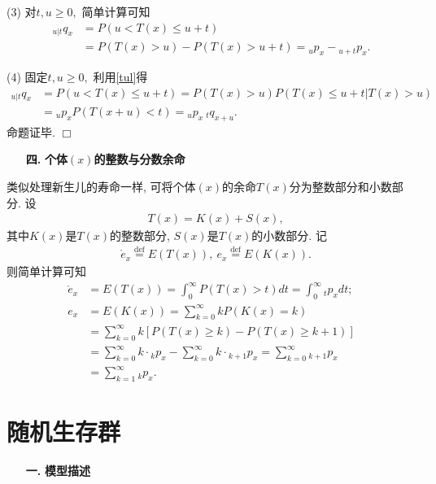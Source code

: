 \documentclass[a4paper,openany, 10pt]{ctexbook}
\newcommand{\hei}{\CJKfamily{hei}}      %
\def\qed{\hfill$\Box$\medskip}
\begin{document}
(3) 对$t,u\ge0,$ 简单计算可知
\begin{align*}
    {}_{u|t}q_x & =P(u<T(x)\leq u+t)                          \\
                & =P(T(x)>u)-P(T(x)>u+t)={}_up_x-{}_{u+t}p_x.
\end{align*}

(4) 固定$t,u\ge0,$ 利用\eqref{tul}得
\begin{align*}
    {}_{u|t}q_x & =P(u<T(x)\leq u+t)=P(T(x)>u)P(T(x)\leq u+t|T(x)>u) \\
                & ={}_up_xP(T(x+u)<t)= {}_up_x{}~_{t}q_{x+u}.
\end{align*}
命题证毕. \qed

\begin{itemize}
    \item[{\bf\hei 四.}]{\bf\hei 个体$(x)$的整数与分数余命}
\end{itemize}
类似处理新生儿的寿命一样, 可将个体$(x)$的余命$T(x)$分为整数部分和小数部分.
设
\begin{align*}
     & T(x)=K(x)+S(x),
\end{align*}
其中$K(x)$是$T(x)$的整数部分, $S(x)$是$T(x)$的小数部分. 记
\begin{align*}
     & \mathring{e}_x\stackrel{\text{def}}{=}E(T(x)), \   {e_x}\stackrel{\text{def}}{=}E(K(x)).
\end{align*}
则简单计算可知 \begin{align*}
    \mathring{e}_x & =E(T(x))=\int_{0}^{\infty}P(T(x)>t)d t=\int_{0}^{\infty}{_tp_xdt};                          \\
    {e_x}          & =E(K(x))=\sum_{k=0}^{\infty}kP(K(x)=k)                                                      \\
                   & =\sum_{k=0}^{\infty}k[P(T(x)\geq k)-P(T(x)\geq k+1)]                                        \\
                   & =\sum_{k=0}^{\infty}k\cdot{}_kp_x-\sum_{k=0}^{\infty}k\cdot{}_{k+1}p_x=\sum_{k=0}^{\infty}{_{k+1}p_x} \\
                   & =\sum_{k=1}^{\infty}{_kp_x}.
\end{align*}

\section{随机生存群}
\begin{itemize}
    \item[{\bf\hei 一.}]{\bf\hei 模型描述}
\end{itemize}
\end{document}
